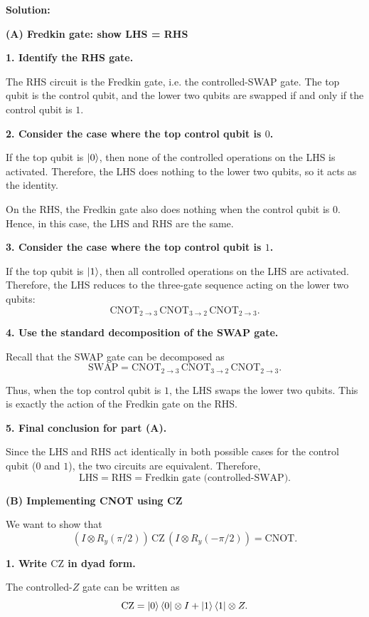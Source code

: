 \documentclass[11pt]{article}
\newenvironment{solution}
{\par\noindent\textbf{Solution:}\par}
{\vspace{1em}}
\begin{document}
\begin{solution}
\textbf{(A) Fredkin gate: show LHS = RHS}

\textbf{1. Identify the RHS gate.}

The RHS circuit is the Fredkin gate, i.e. the controlled-SWAP gate. The top qubit is the control qubit, and the lower two qubits are swapped if and only if the control qubit is \(1\).

\textbf{2. Consider the case where the top control qubit is \(0\).}

If the top qubit is \(\ket{0}\), then none of the controlled operations on the LHS is activated. Therefore, the LHS does nothing to the lower two qubits, so it acts as the identity.

On the RHS, the Fredkin gate also does nothing when the control qubit is \(0\). Hence, in this case, the LHS and RHS are the same.

\textbf{3. Consider the case where the top control qubit is \(1\).}

If the top qubit is \(\ket{1}\), then all controlled operations on the LHS are activated. Therefore, the LHS reduces to the three-gate sequence acting on the lower two qubits: \[\mathrm{CNOT}_{2\to 3}\,\mathrm{CNOT}_{3\to 2}\,\mathrm{CNOT}_{2\to 3}.\]

\textbf{4. Use the standard decomposition of the SWAP gate.}

Recall that the SWAP gate can be decomposed as\[\mathrm{SWAP} = \mathrm{CNOT}_{2\to 3}\,\mathrm{CNOT}_{3\to 2}\,\mathrm{CNOT}_{2\to 3}.\]

Thus, when the top control qubit is \(1\), the LHS swaps the lower two qubits. This is exactly the action of the Fredkin gate on the RHS.

\textbf{5. Final conclusion for part (A).}

Since the LHS and RHS act identically in both possible cases for the control qubit (\(0\) and \(1\)), the two circuits are equivalent. Therefore,
\[\boxed{\text{LHS}=\text{RHS}=\text{Fredkin gate (controlled-SWAP).}}\]

\textbf{(B) Implementing CNOT using CZ}

We want to show that \[(I\otimes R_y(\pi/2))\,\mathrm{CZ}\,(I\otimes R_y(-\pi/2))=\mathrm{CNOT}.\]

\textbf{1. Write \(\mathrm{CZ}\) in dyad form.}

The controlled-\(Z\) gate can be written as
\[\mathrm{CZ} = \ket{0}\bra{0}\otimes I + \ket{1}\bra{1}\otimes Z.\]


\end{solution}
\end{document}
